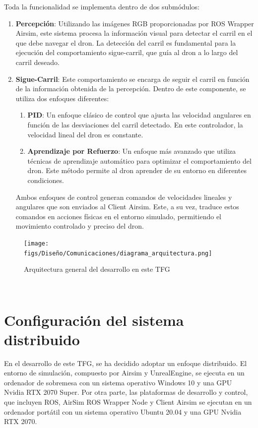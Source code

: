 Toda la funcionalidad se implementa dentro de dos submódulos:
\begin{enumerate}
  \item \textbf{Percepción}: Utilizando las imágenes RGB proporcionadas por ROS Wrapper Airsim, este sistema procesa la información
  visual para detectar el carril en el que debe navegar el dron. La detección del carril es fundamental para la ejecución del comportamiento sigue-carril, que guía al dron 
  a lo largo del carril deseado. 
  \item \textbf{Sigue-Carril}: Este comportamiento se encarga de seguir el carril en función de la información obtenida de la percepción. Dentro de este componente, se 
  utiliza dos enfoques diferentes: 
  \begin{enumerate}
    \item \textbf{PID}: Un enfoque clásico de control que ajusta las velocidad angulares en función de las desviaciones del carril detectado. En este controlador, la velocidad lineal 
    del dron es constante.
    \item \textbf{Aprendizaje por Refuerzo}: Un enfoque más avanzado que utiliza técnicas de aprendizaje automático para optimizar el comportamiento del dron. Este método 
    permite al dron aprender de su entorno en diferentes condiciones. 
  \end{enumerate}

  Ambos enfoques de control generan comandos de velocidades lineales y angulares que son enviados al Client Airsim. Este, a su vez, traduce estos comandos en acciones físicas 
  en el entorno simulado, permitiendo el movimiento controlado y preciso del dron. 
\end{enumerate}

\begin{figure} [H]
    \begin{center}
      \texttt{[image: figs/Diseño/Comunicaciones/diagrama\_arquitectura.png]}
    \end{center}
    \caption{Arquitectura general del desarrollo en este TFG}
    \label{fig:infraestructura}
  \end{figure}\

\section{Configuración del sistema distribuido}
\label{distribución}
En el desarrollo de este TFG, se ha decidido adoptar un enfoque distribuido. El entorno de simulación, compuesto por Airsim y UnrealEngine, se ejecuta en un ordenador de sobremesa con un sistema 
operativo Windows 10 y una GPU Nvidia RTX 2070 Super. Por otra parte, las plataformas de desarrollo y control, que incluyen ROS, AirSim ROS Wrapper Node y Client Airsim se ejecutan en un ordenador
portátil con un sistema operativo Ubuntu 20.04 y una GPU Nvidia RTX 2070.

